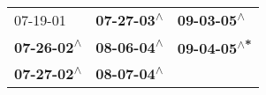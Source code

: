 \begin{supertabular}{lll}
                  07-19-01\textsuperscript{} &  \textbf{07-27-03\textsuperscript{$\wedge$}} &   \textbf{09-03-05\textsuperscript{$\wedge$}} \\
 \textbf{07-26-02\textsuperscript{$\wedge$}} &  \textbf{08-06-04\textsuperscript{$\wedge$}} &  \textbf{09-04-05\textsuperscript{$\wedge$*}} \\
 \textbf{07-27-02\textsuperscript{$\wedge$}} &  \textbf{08-07-04\textsuperscript{$\wedge$}} &                                               \\
\end{supertabular}
